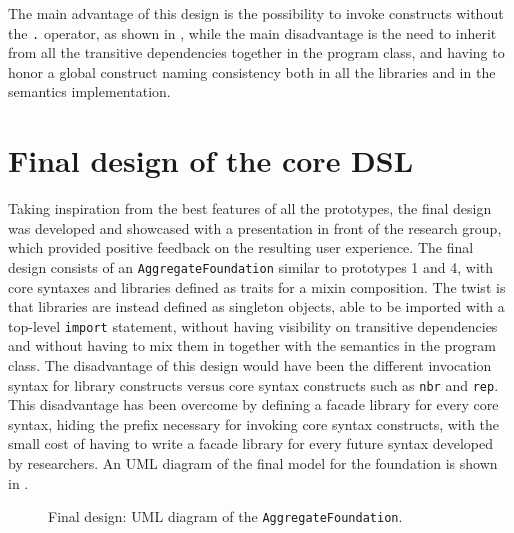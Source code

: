 The main advantage of this design is the possibility to invoke constructs without the \texttt{.} operator, as shown in , while the main disadvantage is the need to inherit from all the transitive dependencies together in the program class, and having to honor a global construct naming consistency both in all the libraries and in the semantics implementation.



\section{Final design of the core DSL} \label{chap:design->sec:final-dsl}

Taking inspiration from the best features of all the prototypes, the final design was developed and showcased with a presentation in front of the research group, which provided positive feedback on the resulting user experience.
%
The final design consists of an \texttt{AggregateFoundation} similar to prototypes 1 and 4, with core syntaxes and libraries defined as traits for a mixin composition.
%
The twist is that libraries are instead defined as singleton objects, able to be imported with a top-level \texttt{import} statement, without having visibility on transitive dependencies and without having to mix them in together with the semantics in the program class.
%
The disadvantage of this design would have been the different invocation syntax for library constructs versus core syntax constructs such as \texttt{nbr} and \texttt{rep}.
%
This disadvantage has been overcome by defining a facade library for every core syntax, hiding the  prefix necessary for invoking core syntax constructs, with the small cost of having to write a facade library for every future syntax developed by researchers.
%
An \ac{UML} diagram of the final model for the foundation is shown in .

\begin{figure}
    \centering
    \caption{Final design: \ac{UML} diagram of the \texttt{AggregateFoundation}.}
    \label{fig:final-design-foundation-diagram}
    \bigskip
    \resizebox{\linewidth}{!}{
        
    }
\end{figure}

